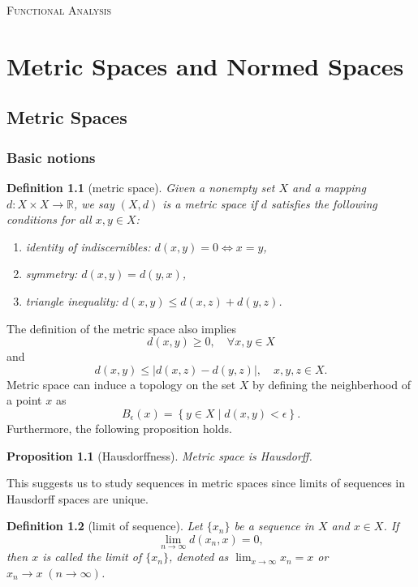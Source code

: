 \documentclass{report}
\newtheorem{definition}{Definition}[section]
\newtheorem{proposition}{Proposition}[section]
\theoremstyle{nonumberplain}
\begin{document}
\begin{center}
	\textsc{\Huge Functional Analysis}
	~\\
	\vspace{1em}  
	
\end{center}
\vspace{1em} 
\tableofcontents
\chapter{Metric Spaces and Normed Spaces}
\section{Metric Spaces}
\subsection{Basic notions}
\begin{definition}[metric space]
	Given a nonempty set $X$ and a mapping $d:X\times X\to \mathbb{R}$, we say $(X,d)$ is a \emph{metric space} if $d$ satisfies the following conditions for all $x,y\in X$:
	\begin{enumerate}
		\item identity of indiscernibles: $d(x,y)=0\iff x=y$,
		\item symmetry: $d(x,y)=d(y,x)$,
		\item triangle inequality: $d(x,y)\le d(x,z)+d(y,z)$.
	\end{enumerate}	
\end{definition}

\noindent The definition of the metric space also implies
\[
	d(x,y)\ge 0,\quad\forall x,y\in X
\]
and 
\[
	d(x,y)\le|d(x,z)-d(y,z)|,\quad x,y,z\in X.
\]
Metric space can induce a topology on the set $X$ by defining the neighberhood of a point $x$ as 
\[
	B_\epsilon(x)=\left\{y\in X\mid d(x,y)<\epsilon \right\}.
\]
Furthermore, the following proposition holds.

\begin{proposition}[Hausdorffness]
	Metric space is Hausdorff.
\end{proposition}
This suggests us to study sequences in metric spaces since limits of sequences in Hausdorff spaces are unique. 
\begin{definition}[limit of sequence]
	Let $\{x_n\}$ be a sequence in $X$ and $x\in X$. If
	\[
		\lim_{n\to\infty}d(x_n,x)=0,
	\]
	then $x$ is called the \emph{limit} of $\{x_n\}$, denoted as $\lim_{x\to\infty}x_n=x$ or $x_n\to x\;(n\to\infty)$.
\end{definition}
\end{document}
